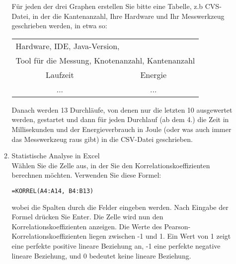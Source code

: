 \documentclass{article}
\begin{document}
\begin{enumerate}
\begin{enumerate}
					Für jeden der drei Graphen erstellen Sie bitte  eine Tabelle, z.b CVS-Datei, 
					in der die Kantenanzahl, Ihre Hardware und Ihr Messwerkzeug geschrieben werden, in etwa so:
					
					\begin{tabular}{|c|c|}
						\hline
						\multicolumn{2}{|l|}{Hardware, IDE, Java-Version, } \\
						\multicolumn{2}{|l|}{ Tool für die Messung, Knotenanzahl, Kantenanzahl} \\ \hline \hline
						Laufzeit & Energie \\ \hline
						 ... &  ...\\ \hline
					\end{tabular}
			
					Danach werden 13 Durchläufe, von denen nur die letzten 10 ausgewertet werden, gestartet und 
					dann für jeden Durchlauf (ab dem 4.) die Zeit in Millisekunden und der Energieverbrauch in Joule 
					(oder was auch immer das Messwerkzeug raus gibt)
					in die  CSV-Datei geschrieben. 
					
					
					\item Statistische Analyse in Excel\\
					      Wählen Sie die Zelle aus, in der Sie den Korrelationskoeffizienten berechnen möchten.
								Verwenden Sie diese Formel:  								
								\begin{center}
								\texttt{=KORREL(A4:A14, B4:B13)}
								\end{center}
								wobei die Spalten durch die Felder 
								eingeben werden.  Nach Eingabe der Formel drücken Sie Enter. 
								Die Zelle wird nun den Korrelationskoeffizienten anzeigen.
Die Werte des Pearson-Korrelationskoeffizienten liegen zwischen -1 und 1. Ein Wert von 1 zeigt eine perfekte positive lineare Beziehung an, -1 eine perfekte negative lineare Beziehung, und 0 bedeutet keine lineare Beziehung.
					\end{enumerate}

	\end{enumerate}
\end{document}
